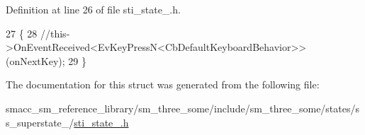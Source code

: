 Definition at line 26 of file sti\+\_\+state\+\_.\+h.


\begin{DoxyCode}
27   \{
28     \textcolor{comment}{//this->OnEventReceived<EvKeyPressN<CbDefaultKeyboardBehavior>>(onNextKey);}
29   \}
\end{DoxyCode}


The documentation for this struct was generated from the following file\+:\begin{DoxyCompactItemize}
\item 
smacc\+\_\+sm\+\_\+reference\+\_\+library/sm\+\_\+three\+\_\+some/include/sm\+\_\+three\+\_\+some/states/ss\+\_\+superstate\+\_/\hyperlink{sti__state__3_8h}{sti\+\_\+state\+\_.\+h}\end{DoxyCompactItemize}
